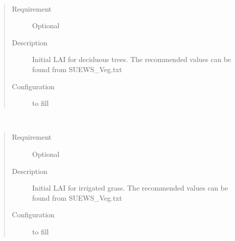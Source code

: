 \documentclass[letterpaper,10pt,english]{sphinxmanual}
\begin{document}

\begin{fulllineitems}
\label{\detokenize{input_files/Initial_Conditions/Vegetation_parameters:cmdoption-arg-laiinitialdectr}}~\begin{quote}\begin{description}
\item[{Requirement}] \leavevmode
Optional

\item[{Description}] \leavevmode
Initial LAI for deciduous trees. The recommended values can be found from SUEWS\_Veg.txt

\item[{Configuration}] \leavevmode
to fill

\end{description}\end{quote}

\end{fulllineitems}


\begin{fulllineitems}
\label{\detokenize{input_files/Initial_Conditions/Vegetation_parameters:cmdoption-arg-laiinitialgrass}}~\begin{quote}\begin{description}
\item[{Requirement}] \leavevmode
Optional

\item[{Description}] \leavevmode
Initial LAI for irrigated grass. The recommended values can be found from SUEWS\_Veg.txt

\item[{Configuration}] \leavevmode
to fill

\end{description}\end{quote}

\end{fulllineitems}

\end{document}
